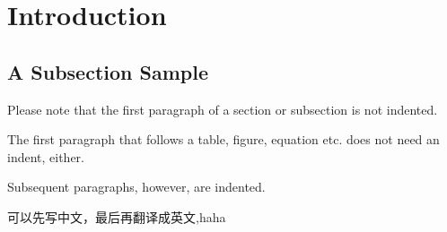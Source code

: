 \section{Introduction}
\subsection{A Subsection Sample}
Please note that the first paragraph of a section or subsection is not indented. 

The first paragraph that follows a table, figure,
equation etc. does not need an indent, either.

Subsequent paragraphs, however, are indented.

可以先写中文，最后再翻译成英文,haha\cite{hjalmarsson1996dea}
